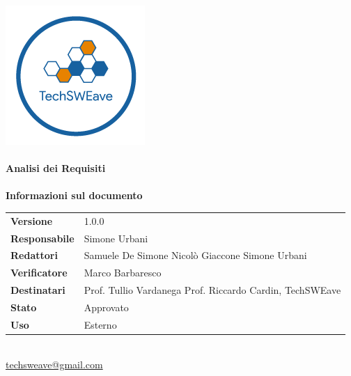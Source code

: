 \documentclass[a4paper]{article}
\begin{document}
\begin{titlepage}
    \begin{center}
        \includegraphics{../../../Images/logo.png}\\
        \vspace{20px}
        \textcolor{logo}{\hrulefill}\\
        \vspace{20px}
        \textbf{\huge\textcolor{logo}{Analisi dei Requisiti}}\\
        \vspace{10px}
        \textcolor{logo}{\hrulefill}\\
        \vspace{40px}
        \textbf{\Large Informazioni sul documento}\\
        \vspace{20px}
        \begin{tabular}{p{100px} | p{100px}}
            \textbf{Versione}     & 1.0.0                                                                      \\
            \textbf{Responsabile} & Simone Urbani                                                              \\
            \textbf{Redattori}    & Samuele De Simone \newline Nicolò Giaccone \newline Simone Urbani          \\
            \textbf{Verificatore} & Marco Barbaresco                                                           \\
            \textbf{Destinatari}  & Prof. Tullio Vardanega \newline Prof. Riccardo Cardin, \newline TechSWEave \\
            \textbf{Stato}        & Approvato                                                                  \\
            \textbf{Uso}          & Esterno                                                                    \\
        \end{tabular}\\
        \vspace{60px}
        \href{mailto:techsweave@gmail.com}{techsweave@gmail.com}\\

    \end{center}
\end{titlepage}
\end{document}
